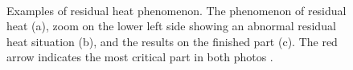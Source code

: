 \begin{figure}
    \centering
    \\
    \quad
    \caption[Residual heat.]{Examples of residual heat phenomenon. The phenomenon of residual heat (a), zoom on the lower left side showing an abnormal residual heat situation (b), and the results on the finished part (c). The red arrow indicates the most critical part in both photos \cite{boone_thermal_2018}.}
    \label{fig:hotspottini}
\end{figure}
